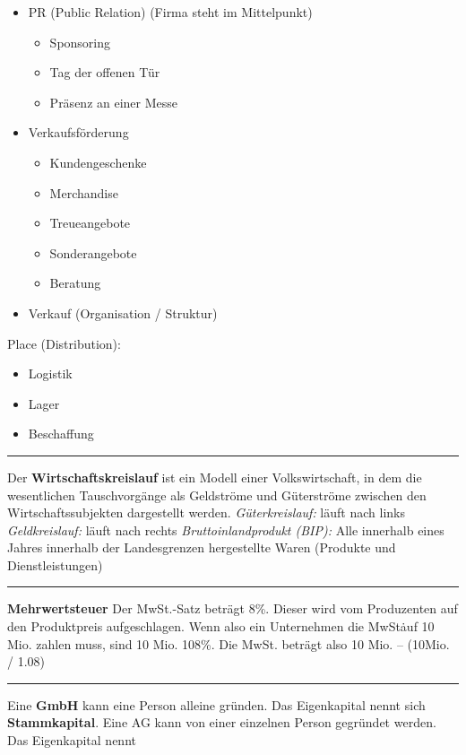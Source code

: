 \documentclass{article} %
\begin{document}
\begin{minipage}[t][0.8\textheight]{0.97\textwidth}
\begin{multicols*}{4}
\begin{flushleft}
{\begin{itemize}
				\item PR (Public Relation) (Firma steht im Mittelpunkt)
					\begin{itemize}
						\item Sponsoring
						\item Tag der offenen Tür
						\item Präsenz an einer Messe
					\end{itemize}
				\item Verkaufsförderung
					\begin{itemize}
						\item Kundengeschenke
						\item Merchandise
						\item Treueangebote
						\item Sonderangebote
						\item Beratung
					\end{itemize}
				\item Verkauf (Organisation / Struktur)
			\end{itemize}
			Place (Distribution):
			\begin{itemize}
				\item Logistik
				\item Lager
				\item Beschaffung
			\end{itemize}
			\noindent\rule{\linewidth}{0.4pt}
			Der \textbf{Wirtschaftskreislauf} ist ein Modell einer Volkswirtschaft,
			in dem die wesentlichen
			Tauschvorgänge als Geldströme und Güterströme zwischen 
			den Wirtschaftssubjekten dargestellt werden.
			\newline\textit{Güterkreislauf:} läuft nach links
			\newline\textit{Geldkreislauf:} läuft nach rechts
			\newline\textit{Bruttoinlandprodukt (BIP):} Alle innerhalb eines 
			Jahres innerhalb der Landesgrenzen
			hergestellte Waren (Produkte und Dienstleistungen)
			\noindent\rule{\linewidth}{0.4pt}
			\textbf{Mehrwertsteuer}\newline
			Der MwSt.-Satz beträgt 8\%. Dieser wird
			vom Produzenten auf den Produktpreis
			aufgeschlagen. Wenn also ein Unternehmen
			die MwSt\. auf 10 Mio. zahlen muss, sind 10
			Mio. 108\%. Die MwSt. beträgt also 10 Mio. – (10Mio. / 1.08)
			\noindent\rule{\linewidth}{0.4pt}
			Eine \textbf{GmbH} kann eine Person alleine
			gründen. Das Eigenkapital nennt sich \textbf{Stammkapital}.
			Eine AG kann von einer einzelnen Person
			gegründet werden. Das Eigenkapital nennt
}
\end{flushleft}
\end{multicols*}
\end{minipage}
\end{document}
